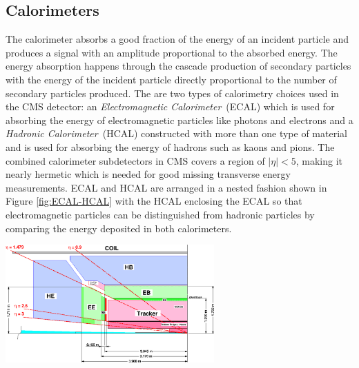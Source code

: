 \subsection{Calorimeters}
The calorimeter absorbs a good fraction of the energy of an incident particle and produces a signal with an amplitude proportional to the absorbed energy. The energy absorption happens through the cascade production of secondary particles with the energy of the incident particle directly proportional to the number of secondary particles produced. The are two types of calorimetry choices used in the CMS detector: an \textit{Electromagnetic Calorimeter}~(ECAL) which is used for absorbing the energy of electromagnetic particles like photons and electrons and a \textit{Hadronic Calorimeter}~(HCAL) constructed with more than one type of material and is used for absorbing the energy of hadrons such as kaons and pions. The combined calorimeter subdetectors in CMS covers a region of $|\eta| < 5$, making it nearly hermetic which is needed for good missing transverse energy measurements. ECAL and HCAL are arranged in a nested fashion shown in Figure \ref{fig:ECAL-HCAL} with the HCAL enclosing the ECAL so that electromagnetic particles can be distinguished from hadronic particles by comparing the energy deposited in both calorimeters.

\vspace{5mm}
\begin{minipage}{0.95\linewidth}
\begin{center}
\mbox{\includegraphics[height=0.40\textwidth, width=0.6\textwidth]{THESISPLOTS/ECAL-HCAL.eps}} 
\label{fig:ECAL-HCAL}
\end{center}
\end{minipage}

